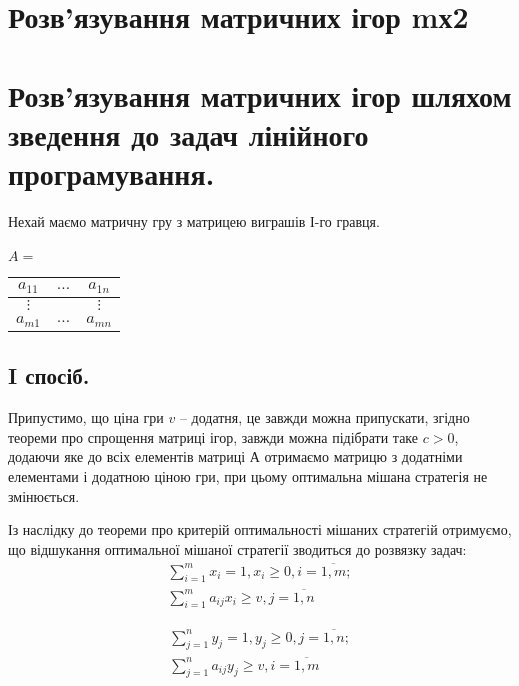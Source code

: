 \documentclass[12pt,a4paper]{book}
\begin{document}
\section{Розв’язування матричних ігор mх2}
\section{Розв'язування матричних ігор шляхом зведення до задач лінійного програмування.}

Нехай маємо матричну гру з матрицею виграшів І-го гравця.\\
\\
$A =$
\begin{tabular}{|c|c|c|}
\hline
$a_{1 1}$&$\dots$&$a_{1 n}$\\
\hline
$\vdots$&&$\vdots$\\
\hline
$a_{m 1}$&$\dots$&$a_{m n}$\\
\hline
\end{tabular}

\subsection{I спосіб.}

Припустимо, що ціна гри $v$ – додатня, це завжди можна припускати, згідно теореми про спрощення матриці ігор, завжди можна підібрати таке $c>0$, додаючи яке до всіх елементів матриці $А$ отримаємо матрицю з додатніми елементами і додатною ціною гри, при цьому оптимальна мішана стратегія не змінюється. 

Із наслідку до теореми про критерій оптимальності мішаних стратегій отримуємо, що відшукання оптимальної мішаної стратегії зводиться до розвязку задач:
\begin{equation}
\begin{array}{l}
\displaystyle \sum_{i=1}^m x_i = 1, x_i \geq 0, i=\overline{1,m};\\
\displaystyle \sum_{i=1}^m a_{ij} x_i \geq v,  j=\overline{1,n}
\end{array}
\label{eq:mgtolp1p}
\end{equation}

\begin{equation}
\begin{array}{l}
\displaystyle \sum_{j=1}^n y_j = 1, y_j \geq 0, j=\overline{1,n};\\
\displaystyle \sum_{j=1}^n a_{ij} y_j \geq v,  i=\overline{1,m}
\end{array}
\label{eq:mgtolp2p}
\end{equation}
\end{document}
